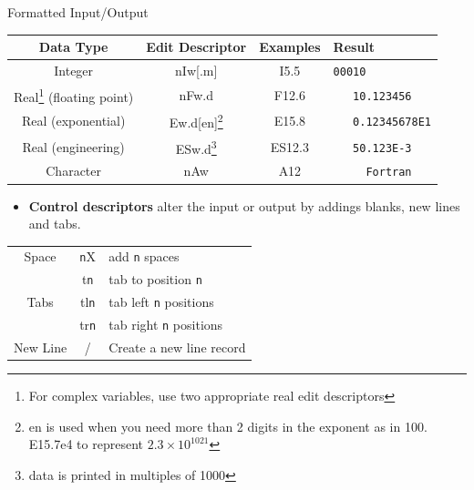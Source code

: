 \documentclass[10pt,t]{beamer}
\begin{document}
\begin{frame}{Formatted Input/Output}
\begin{minipage}{\textwidth}
\begin{center}
      \scriptsize
      \begin{tabular}{|c|c|c|l|}
        \hline
        Data Type & Edit Descriptor & Examples & Result\\
        \hline
        Integer & nIw[.m] & I5.5 & \lstinline[showspaces=true]|00010|\\
        Real\footnote{\tiny For complex variables, use two appropriate real edit descriptors } (floating point) & nFw.d & F12.6 & \lstinline[showspaces=true]|   10.123456|\\
        Real (exponential) & Ew.d[en]\footnote{\tiny en is used when you need more than 2 digits in the exponent as in 100. E15.7e4 to represent $2.3\times10^{1021}$} & E15.8 & \lstinline[showspaces=true]|   0.12345678E1| \\
        Real (engineering) &  ESw.d\footnote{\tiny data is printed in multiples of 1000} & ES12.3 & \lstinline[showspaces=true]|   50.123E-3| \\
        Character & nAw & A12 & \lstinline[showspaces=true]|     Fortran| \\
        \hline
      \end{tabular}
    \end{center}
  \end{minipage}
  \begin{itemize}
    \item \textbf{Control descriptors} alter the input or output by addings blanks, new lines and tabs.
  \end{itemize}
  \begin{center}
    \scriptsize
    \begin{tabular}{|c|c|l|}
      \hline
      Space & \texttt{n}X & add \texttt{n} spaces \\
      \multirow{3}{*}{Tabs} & t\texttt{n} & tab to position \texttt{n} \\
      & tl\texttt{n} & tab left \texttt{n} positions \\
      & tr\texttt{n} & tab right \texttt{n} positions \\
      New Line & / & Create a new line record \\
      \hline
    \end{tabular}
  \end{center}
\end{frame}
\end{document}
